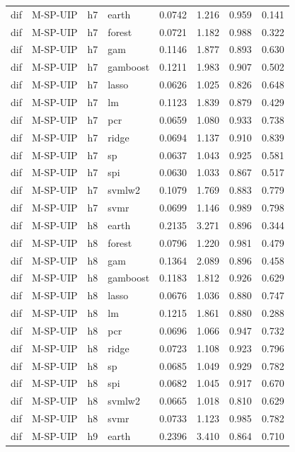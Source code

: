 \begin{ThreePartTable}
\begin{longtable}[t]{llclcccc}
\addlinespace
dif & M-SP-UIP & h7 & earth & 0.0742 & 1.216 & 0.959 & 0.141\\
dif & M-SP-UIP & h7 & forest & 0.0721 & 1.182 & 0.988 & 0.322\\
dif & M-SP-UIP & h7 & gam & 0.1146 & 1.877 & 0.893 & 0.630\\
dif & M-SP-UIP & h7 & gamboost & 0.1211 & 1.983 & 0.907 & 0.502\\
dif & M-SP-UIP & h7 & lasso & 0.0626 & 1.025 & 0.826 & 0.648\\
dif & M-SP-UIP & h7 & lm & 0.1123 & 1.839 & 0.879 & 0.429\\
dif & M-SP-UIP & h7 & pcr & 0.0659 & 1.080 & 0.933 & 0.738\\
dif & M-SP-UIP & h7 & ridge & 0.0694 & 1.137 & 0.910 & 0.839\\
dif & M-SP-UIP & h7 & sp & 0.0637 & 1.043 & 0.925 & 0.581\\
dif & M-SP-UIP & h7 & spi & 0.0630 & 1.033 & 0.867 & 0.517\\
dif & M-SP-UIP & h7 & svmlw2 & 0.1079 & 1.769 & 0.883 & 0.779\\
dif & M-SP-UIP & h7 & svmr & 0.0699 & 1.146 & 0.989 & 0.798\\
\addlinespace
dif & M-SP-UIP & h8 & earth & 0.2135 & 3.271 & 0.896 & 0.344\\
dif & M-SP-UIP & h8 & forest & 0.0796 & 1.220 & 0.981 & 0.479\\
dif & M-SP-UIP & h8 & gam & 0.1364 & 2.089 & 0.896 & 0.458\\
dif & M-SP-UIP & h8 & gamboost & 0.1183 & 1.812 & 0.926 & 0.629\\
dif & M-SP-UIP & h8 & lasso & 0.0676 & 1.036 & 0.880 & 0.747\\
dif & M-SP-UIP & h8 & lm & 0.1215 & 1.861 & 0.880 & 0.288\\
dif & M-SP-UIP & h8 & pcr & 0.0696 & 1.066 & 0.947 & 0.732\\
dif & M-SP-UIP & h8 & ridge & 0.0723 & 1.108 & 0.923 & 0.796\\
dif & M-SP-UIP & h8 & sp & 0.0685 & 1.049 & 0.929 & 0.782\\
dif & M-SP-UIP & h8 & spi & 0.0682 & 1.045 & 0.917 & 0.670\\
dif & M-SP-UIP & h8 & svmlw2 & 0.0665 & 1.018 & 0.810 & 0.629\\
dif & M-SP-UIP & h8 & svmr & 0.0733 & 1.123 & 0.985 & 0.782\\
\addlinespace
dif & M-SP-UIP & h9 & earth & 0.2396 & 3.410 & 0.864 & 0.710\\

\end{longtable}
\end{ThreePartTable}
